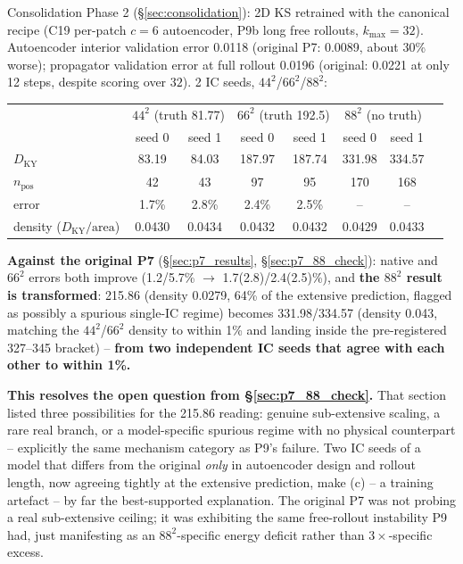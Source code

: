 \documentclass[11pt]{article}
\begin{document}
Consolidation Phase 2 (\S\ref{sec:consolidation}): 2D KS retrained with
the canonical recipe (C19 per-patch $c{=}6$ autoencoder, P9b long free
rollouts, $k_{\max}{=}32$). Autoencoder interior validation error 0.0118
(original P7: 0.0089, about 30\% worse); propagator validation error at
full rollout 0.0196 (original: 0.0221 at only 12 steps, despite scoring
over $32$). 2 IC seeds, $44^2$/$66^2$/$88^2$:
\begin{center}
\small
\begin{tabular}{lccccccc}
\toprule
 & \multicolumn{2}{c}{$44^2$ (truth 81.77)} & \multicolumn{2}{c}{$66^2$ (truth 192.5)} & \multicolumn{2}{c}{$88^2$ (no truth)} \\
 & seed 0 & seed 1 & seed 0 & seed 1 & seed 0 & seed 1 \\
\midrule
$D_{\mathrm{KY}}$ & 83.19 & 84.03 & 187.97 & 187.74 & 331.98 & 334.57 \\
$n_{\mathrm{pos}}$ & 42 & 43 & 97 & 95 & 170 & 168 \\
error & 1.7\% & 2.8\% & 2.4\% & 2.5\% & -- & -- \\
density ($D_{\mathrm{KY}}/\mathrm{area}$) & 0.0430 & 0.0434 & 0.0432 & 0.0432 & 0.0429 & 0.0433 \\
\bottomrule
\end{tabular}
\end{center}

\textbf{Against the original P7} (\S\ref{sec:p7_results},
\S\ref{sec:p7_88_check}): native and $66^2$ errors both improve
(1.2/5.7\% $\to$ 1.7(2.8)/2.4(2.5)\%), and \textbf{the $88^2$ result is
transformed}: 215.86 (density 0.0279, 64\% of the extensive prediction,
flagged as possibly a spurious single-IC regime) becomes 331.98/334.57
(density 0.043, matching the $44^2$/$66^2$ density to within 1\% and
landing inside the pre-registered 327--345 bracket) -- \textbf{from two
independent IC seeds that agree with each other to within 1\%.}

\textbf{This resolves the open question from \S\ref{sec:p7_88_check}.}
That section listed three possibilities for the 215.86 reading: genuine
sub-extensive scaling, a rare real branch, or a model-specific spurious
regime with no physical counterpart -- explicitly the same mechanism
category as P9's failure. Two IC seeds of a model that differs from the
original \emph{only} in autoencoder design and rollout length, now
agreeing tightly at the extensive prediction, make (c) -- a training
artefact -- by far the best-supported explanation. The original P7 was
not probing a real sub-extensive ceiling; it was exhibiting the same
free-rollout instability P9 had, just manifesting as an $88^2$-specific
energy deficit rather than $3\times$-specific excess.
\end{document}
